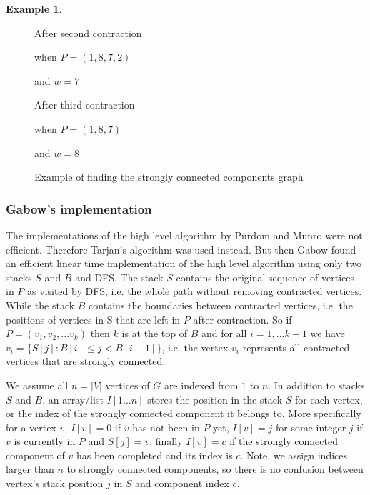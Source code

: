 \documentclass{report}
\theoremstyle{plain}
\theoremstyle{definition}
\newtheorem{example}{Example}
\theoremstyle{remark}
\numberwithin{definition}{chapter}
\numberwithin{example}{chapter}
\numberwithin{figure}{chapter}
\numberwithin{theorem}{chapter}
\numberwithin{lemma}{chapter}
\begin{document}
\begin{example}
\begin{figure}[h]
After second contraction

when $P=(1,8,7,2)$

and $w=7$
\endminipage\hfill
{}

After third contraction

when $P=(1,8,7)$

and $w=8$
\endminipage\hfill

\caption{Example of finding the strongly connected components graph}
\label{high_figure}
\end{figure}
\label{high_example}
\end{example}

\subsubsection*{Gabow's implementation}

The implementations of the high level algorithm by Purdom and Munro were not efficient. Therefore Tarjan's algorithm was used instead. But then Gabow found an efficient linear time implementation of the high level algorithm using only two stacks $S$ and $B$ and DFS. The stack $S$ contains the original sequence of vertices in $P$ as visited by DFS, i.e. the whole path without removing contracted vertices. While the stack $B$ contains the boundaries between contracted vertices, i.e. the positions of vertices in S that are left in $P$ after contraction. So if $P=(v_1, v_2,...v_k)$ then $k$ is at the top of $B$ and for all $i = 1,...k-1$ we have $v_i=\{ S[j] : B[i] \leq j < B[i+1] \}$, i.e. the vertex $v_i$ represents all contracted vertices that are strongly connected.

We assume all $n=|V|$ vertices of $G$ are indexed from $1$ to $n$. In addition to stacks $S$ and $B$, an array/list $I[1\ldots n]$ stores the position in the stack $S$ for each vertex, or the index of the strongly connected component it belongs to.  More specifically for a vertex $v$, $I[v] = 0$ if $v$ has not been in $P$ yet, $I[v]=j$ for some integer $j$ if $v$ is currently in $P$ and $S[j]=v$, finally $I[v]=c$ if the strongly connected component of $v$ has been completed and its index is $c$. Note, we assign indices larger than $n$ to strongly connected components, so there is no confusion between vertex's stack position $j$ in $S$ and component index $c$.
\end{document}
